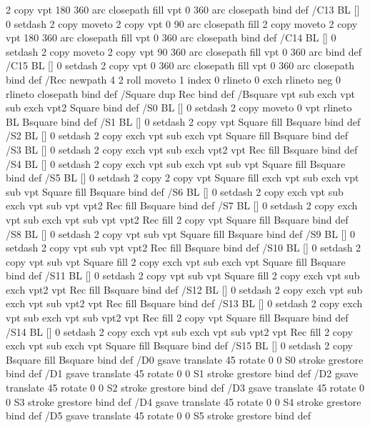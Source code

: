 {{       2 copy  vpt 180 360 arc closepath fill
               vpt 0 360 arc closepath } bind def
/C13 { BL [] 0 setdash  2 copy moveto
       2 copy  vpt 0 90 arc closepath fill
       2 copy moveto
       2 copy  vpt 180 360 arc closepath fill
               vpt 0 360 arc closepath } bind def
/C14 { BL [] 0 setdash 2 copy moveto
       2 copy  vpt 90 360 arc closepath fill
               vpt 0 360 arc } bind def
/C15 { BL [] 0 setdash 2 copy vpt 0 360 arc closepath fill
               vpt 0 360 arc closepath } bind def
/Rec   { newpath 4 2 roll moveto 1 index 0 rlineto 0 exch rlineto
       neg 0 rlineto closepath } bind def
/Square { dup Rec } bind def
/Bsquare { vpt sub exch vpt sub exch vpt2 Square } bind def
/S0 { BL [] 0 setdash 2 copy moveto 0 vpt rlineto BL Bsquare } bind def
/S1 { BL [] 0 setdash 2 copy vpt Square fill Bsquare } bind def
/S2 { BL [] 0 setdash 2 copy exch vpt sub exch vpt Square fill Bsquare } bind def
/S3 { BL [] 0 setdash 2 copy exch vpt sub exch vpt2 vpt Rec fill Bsquare } bind def
/S4 { BL [] 0 setdash 2 copy exch vpt sub exch vpt sub vpt Square fill Bsquare } bind def
/S5 { BL [] 0 setdash 2 copy 2 copy vpt Square fill
       exch vpt sub exch vpt sub vpt Square fill Bsquare } bind def
/S6 { BL [] 0 setdash 2 copy exch vpt sub exch vpt sub vpt vpt2 Rec fill Bsquare } bind def
/S7 { BL [] 0 setdash 2 copy exch vpt sub exch vpt sub vpt vpt2 Rec fill
       2 copy vpt Square fill
       Bsquare } bind def
/S8 { BL [] 0 setdash 2 copy vpt sub vpt Square fill Bsquare } bind def
/S9 { BL [] 0 setdash 2 copy vpt sub vpt vpt2 Rec fill Bsquare } bind def
/S10 { BL [] 0 setdash 2 copy vpt sub vpt Square fill 2 copy exch vpt sub exch vpt Square fill
       Bsquare } bind def
/S11 { BL [] 0 setdash 2 copy vpt sub vpt Square fill 2 copy exch vpt sub exch vpt2 vpt Rec fill
       Bsquare } bind def
/S12 { BL [] 0 setdash 2 copy exch vpt sub exch vpt sub vpt2 vpt Rec fill Bsquare } bind def
/S13 { BL [] 0 setdash 2 copy exch vpt sub exch vpt sub vpt2 vpt Rec fill
       2 copy vpt Square fill Bsquare } bind def
/S14 { BL [] 0 setdash 2 copy exch vpt sub exch vpt sub vpt2 vpt Rec fill
       2 copy exch vpt sub exch vpt Square fill Bsquare } bind def
/S15 { BL [] 0 setdash 2 copy Bsquare fill Bsquare } bind def
/D0 { gsave translate 45 rotate 0 0 S0 stroke grestore } bind def
/D1 { gsave translate 45 rotate 0 0 S1 stroke grestore } bind def
/D2 { gsave translate 45 rotate 0 0 S2 stroke grestore } bind def
/D3 { gsave translate 45 rotate 0 0 S3 stroke grestore } bind def
/D4 { gsave translate 45 rotate 0 0 S4 stroke grestore } bind def
/D5 { gsave translate 45 rotate 0 0 S5 stroke grestore } bind def
}
